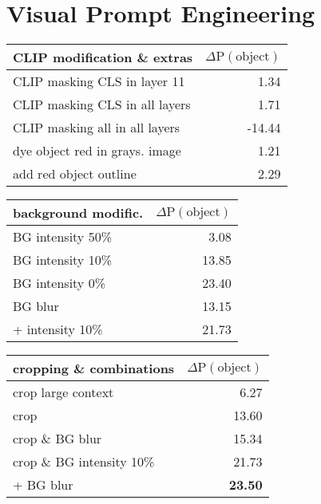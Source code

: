 \documentclass[10pt,twocolumn,letterpaper]{article}
\begin{document}
\section{Visual Prompt Engineering}

\label{sec:prompt_engineering}


\begin{table*}
    \centering
    \footnotesize
    \begin{tabular}{lr}
        \toprule
         CLIP modification \& extras & $\Delta \text{P}(\text{object})$ \\
         \midrule
CLIP masking CLS in layer 11 & 1.34 \\
CLIP masking CLS in all layers & 1.71 \\
CLIP masking all in all layers & -14.44 \\
dye object red in grays. image & 1.21 \\
add red object outline & 2.29 \\
         \bottomrule
    \end{tabular}
    \hspace{0.5cm}
    \begin{tabular}{lr}
        \toprule
        background modific. & $\Delta \text{P}(\text{object})$ \\
         \midrule
BG intensity 50\% & 3.08 \\
BG intensity 10\% & 13.85 \\
BG intensity 0\% & 23.40 \\
BG blur & 13.15 \\
+ intensity 10\% & 21.73 \\
         \bottomrule
    \end{tabular} 
    \hspace{0.5cm}
    \begin{tabular}{lr}
        \toprule
         cropping \& combinations & $\Delta \text{P}(\text{object})$ \\
         \midrule
crop large context & 6.27 \\
crop & 13.60 \\
crop \& BG blur & 15.34 \\
crop \& BG intensity 10\% & 21.73 \\
+ BG blur & \textbf{23.50} \\
         \bottomrule
    \end{tabular}        
    \caption{Visual prompt engineering: Average improvement of object probability for different forms of combining image and mask over 1,600 samples. Cropping means cutting the image according to the regions specified by the mask, ``BG'' means background.}
    \label{tab:prompt_engineering_short}
\end{table*}
\end{document}
